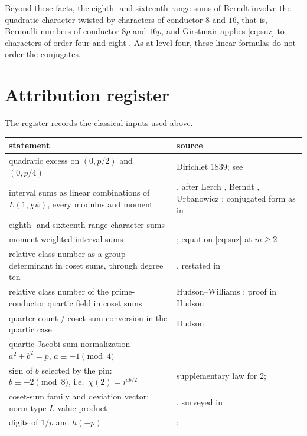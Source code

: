 \documentclass[11pt,reqno]{amsart}
\theoremstyle{plain}
\theoremstyle{definition}
\begin{document}
Beyond these facts, the eighth- and sixteenth-range sums of Berndt \cite[\S10]{Berndt} involve the quadratic character
twisted by characters of conductor $8$ and $16$, that is, Bernoulli numbers of conductor $8p$ and $16p$, and Girstmair applies
\eqref{eq:suz} to characters of order four and eight \cite[(27)]{GirMean}. As at level four, these linear formulas do not
order the conjugates.

\clearpage
\section{Attribution register}\label{sec:register}

The register records the classical inputs used above.

\begin{center}\small
\begin{tabular}{p{}p{}}
\toprule
statement & source\\
\midrule
quadratic excess on $(0,p/2)$ and $(0,p/4)$ & Dirichlet 1839; see \cite[(1.1), (1.2)]{Berndt}\\
interval sums as linear combinations of $L(1,\chi\psi)$, every modulus and moment & \cite[(6)]{SUZ}, after Lerch \cite{Lerch},
Berndt \cite{Berndt}, Urbanowicz \cite{Urb}; conjugated form as in \cite[(27)]{GirMean}\\
eighth- and sixteenth-range character sums & \cite[\S7, \S10]{Berndt}\\
moment-weighted interval sums & \cite[\S13]{Berndt}; equation \eqref{eq:suz} at $m\ge2$\\
relative class number as a group determinant in coset sums, through degree ten & \cite{GirMC}, restated in \cite{Kucera}\\
relative class number of the prime-conductor quartic field in coset sums & Hudson--Williams \cite{HW81}; proof in Hudson
\cite[\S2]{Hudson}\\
quarter-count / coset-sum conversion in the quartic case & Hudson \cite[Thm.~3.1]{Hudson}\\
quartic Jacobi-sum normalization $a^2+b^2=p$, $a\equiv-1\pmod4$ & \cite[Cor.~3.10]{BEW}\\
sign of $b$ selected by the pin: $b\equiv-2\pmod8$, i.e.\ $\chi(2)=i^{ab/2}$ & supplementary law for $2$; \cite[Ch.~9]{IR}\\
coset-sum family and deviation vector; norm-type $L$-value product & \cite{GirAbh}, surveyed in \cite{GirSurv}\\
digits of $1/p$ and $h(-p)$ & \cite{GirDig}; \cite[Satz 11]{GirPer}\\

\end{tabular}
\end{center}
\end{document}
